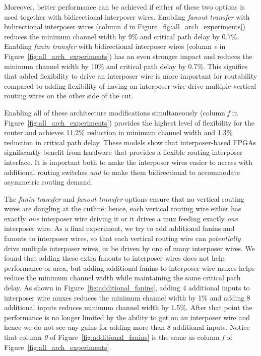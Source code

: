 \documentclass[journal]{IEEEtran}
\begin{document}
Moreover, better performance can be achieved if either of these two options is used together with bidirectional interposer wires. Enabling \textit{fanout transfer} with bidirectional interposer wires (column \textit{d} in Figure~\ref{fig:all_arch_experiments}) reduces the minimum channel width by 9\% and critical path delay by 0.7\%. Enabling \textit{fanin transfer} with bidirectional interposer wires (column \textit{e} in Figure~\ref{fig:all_arch_experiments}) has an even stronger impact and reduces the minimum channel width by 10\% and critical path delay by 0.7\%. This signifies that added flexibility to drive an interposer wire is more important for routability compared to adding flexibility of having an interposer wire drive multiple vertical routing wires on the other side of the cut.

Enabling all of these architecture modifications simultaneously (column \textit{f} in Figure~\ref{fig:all_arch_experiments}) provides the highest level of flexibility for the router and achieves 11.2\% reduction in minimum channel width and 1.3\% reduction in critical path delay. These models show that interposer-based FPGAs significantly benefit from hardware that provides a flexible routing-interposer interface. It is important both to make the interposer wires easier to access with additional routing switches \textit{and} to make them bidirectional to accommodate asymmetric routing demand.

The \textit{fanin transfer} and \textit{fanout transfer} options ensure that no vertical routing wires are dangling at the cutline; hence, each vertical routing wire either has exactly \textit{one} interposer wire driving it or it drives a mux feeding exactly \textit{one} interposer wire. As a final experiment, we try to add additional fanins and fanouts to interposer wires, so that each vertical routing wire can \textit{potentially} drive multiple interposer wires, or be driven by one of many interposer wires. We found that adding these extra fanouts to interposer wires does not help performance or area, but adding additional fanins to interposer wire muxes helps reduce the minimum channel width while maintaining the same critical path delay. As shown in Figure~\ref{fig:additional_fanins}, adding 4 additional inputs to interposer wire muxes reduces the minimum channel width by 1\% and adding 8 additional inputs reduces minimum channel width by 1.5\%. After that point the performance is no longer limited by the ability to get on an interposer wire and hence we do not see any gains for adding more than 8 additional inputs. Notice that column \textit{0} of Figure~\ref{fig:additional_fanins} is the same as column \textit{f} of Figure~\ref{fig:all_arch_experiments}.
\end{document}
